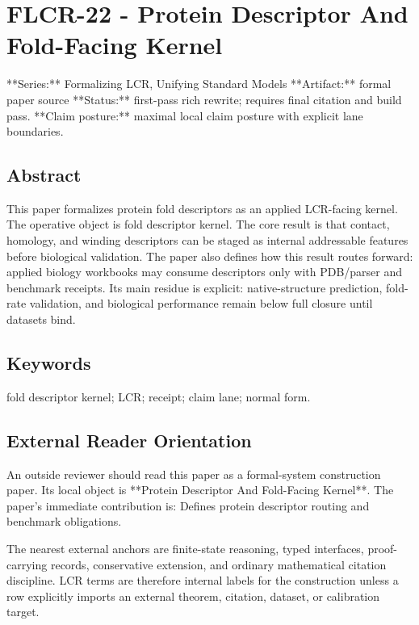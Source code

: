 \documentclass[11pt]{article}
\begin{document}
\section*{FLCR-22 - Protein Descriptor And Fold-Facing Kernel}

**Series:** Formalizing LCR, Unifying Standard Models
**Artifact:** formal paper source
**Status:** first-pass rich rewrite; requires final citation and build pass.
**Claim posture:** maximal local claim posture with explicit lane boundaries.

\subsection*{Abstract}

This paper formalizes protein fold descriptors as an applied LCR-facing kernel. The operative object is fold descriptor kernel. The core result is that contact, homology, and winding descriptors can be staged as internal addressable features before biological validation. The paper also defines how this result routes forward: applied biology workbooks may consume descriptors only with PDB/parser and benchmark receipts. Its main residue is explicit: native-structure prediction, fold-rate validation, and biological performance remain below full closure until datasets bind.

\subsection*{Keywords}

fold descriptor kernel; LCR; receipt; claim lane; normal form.

\subsection*{External Reader Orientation}

An outside reviewer should read this paper as a formal-system construction paper. Its local object is **Protein Descriptor And Fold-Facing Kernel**. The paper's immediate contribution is: Defines protein descriptor routing and benchmark obligations.

The nearest external anchors are finite-state reasoning, typed interfaces, proof-carrying records, conservative extension, and ordinary mathematical citation discipline. LCR terms are therefore internal labels for the construction unless a row explicitly imports an external theorem, citation, dataset, or calibration target.
\end{document}
